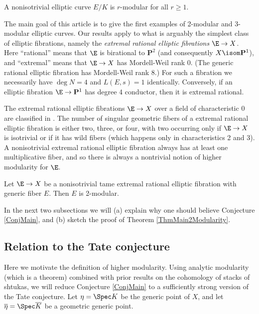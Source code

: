 \documentclass{article}
\def\P{\mathbf{P}}
\begin{document}
\begin{conj}  \label{ConjMain} A nonisotrivial elliptic curve $E/K$ is $r$-modular for all $r\geq 1$.
\end{conj} 

The main goal of this article is to give the first examples of 2-modular and 3-modular elliptic curves.  Our results apply to what is arguably the simplest class of elliptic fibrations, namely the {\em extremal rational elliptic fibrations} $\E\to X$.
Here ``rational'' means that $\E$ is birational to $\P^2$ (and consequently $X\isom \P^1$), and ``extremal'' means that $\E\to X$ has Mordell-Weil rank 0.   (The generic rational elliptic fibration has Mordell-Weil rank 8.)   For such a fibration we necessarily have $\deg N=4$ and $L(E,s)=1$ identically.  Conversely, if an elliptic fibration $\E\to \P^1$ has degree 4 conductor, then it is extremal rational.  

The extremal rational elliptic fibrations $\E\to X$ over a field of characteristic $0$ are classified in \cite{MirandaPersson}.   The number of singular geometric fibers of a extremal rational elliptic fibration is either two, three, or four, with two occurring only if $\E\to X$ is isotrivial or if it has wild fibers (which happens only in characteristics 2 and 3).   A nonisotrivial extremal rational elliptic fibration always has at least one multiplicative fiber, and so there is always a nontrivial notion of higher modularity for $\E$.


\begin{thm}\label{ThmMain2Modularity} Let $\E\to X$ be a nonisotrivial tame extremal rational elliptic fibration with generic fiber $E$.   Then $E$ is 2-modular. 
\end{thm}

In the next two subsections we will (a) explain why one should believe Conjecture \ref{ConjMain}, and (b) sketch the proof of Theorem \ref{ThmMain2Modularity}.

\subsection{Relation to the Tate conjecture}

Here we motivate the definition of higher modularity.  Using analytic modularity (which is a theorem) combined with prior results on the cohomology of stacks of shtukas, we will reduce Conjecture \ref{ConjMain} to a sufficiently strong version of the Tate conjecture.   Let $\eta=\Spec K$ be the generic point of $X$, and let $\overline{\eta}=\Spec \overline{K}$ be a geometric generic point.
\end{document}
